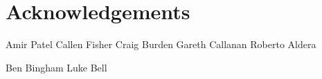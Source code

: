 \chapter{Acknowledgements}
Amir Patel
Callen Fisher
Craig Burden
Gareth Callanan
Roberto Aldera

Ben Bingham
Luke Bell
